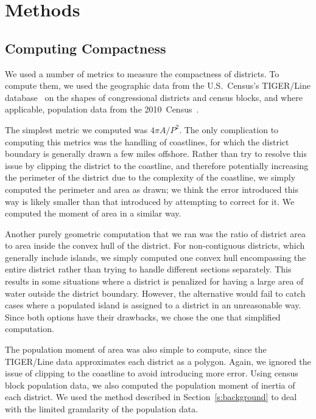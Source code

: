 \documentclass[12pt]{article}
\begin{document}
  \section{Methods}

  \subsection{Computing Compactness}

  We used a number of metrics to measure the compactness of districts.  To compute them, we used the geographic data from the U.S.~Census's TIGER/Line database~\cite{censustiger} on the shapes of congressional districts and census blocks, and where applicable, population data from the 2010~Census~\cite{census2010}.

  The simplest metric we computed was $4\pi A/P^2$.  The only complication to computing this metrics was the handling of coastlines, for which the district boundary is generally drawn a few miles offshore.  Rather than try to resolve this issue by clipping the district to the coastline, and therefore potentially increasing the perimeter of the district due to the complexity of the coastline, we simply computed the perimeter and area as drawn; we think the error introduced this way is likely smaller than that introduced by attempting to correct for it.  We computed the moment of area in a similar way.
  
  Another purely geometric computation that we ran was the ratio of district area to area inside the convex hull of the district. For non-contiguous districts, which generally include islands, we simply computed one convex hull encompassing the entire district rather than trying to handle different sections separately. This results in some situations where a district is penalized for having a large area of water outside the district boundary. However, the alternative would fail to catch cases where a populated island is assigned to a district in an unreasonable way. Since both options have their drawbacks, we chose the one that simplified computation.

  The population moment of area was also simple to compute, since the TIGER/Line data approximates each district as a polygon.  Again, we ignored the issue of clipping to the coastline to avoid introducing more error.  Using census block population data, we also computed the population moment of inertia of each district.  We used the method described in Section~\ref{s:background} to deal with the limited granularity of the population data.
\end{document}
